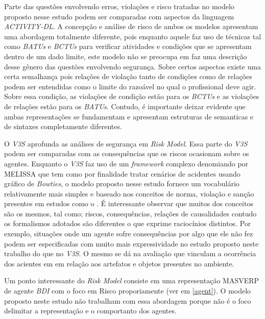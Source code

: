 Parte das questões envolvendo erros, violações e risco tratadas no modelo proposto nesse estudo podem ser comparadas com aspectos da linguagem \textit{ACTIVITY-DL}. A concepção e análise de risco de ambos os modelos apresentam uma abordagem totalmente diferente, pois enquanto aquele faz uso de técnicas tal como \textit{BATUs} e \textit{BCTUs} para verificar atividades e condições que se apresentam dentro de um dado limite, este modelo não se preocupa em faz uma descrição desse gênero das questões envolvendo segurança. Sobre certos aspectos existe uma certa semalhança pois relações de violação tanto de condições como de relações podem ser entendidas como o limite do razoável no qual o profissional deve agir. Sobre essa condição, as violações de condição estão para os \textit{BCTUs} e as violações de relações estão para os \textit{BATUs}. Contudo, é importante deixar evidente que ambas representações se fundamentam e apresentam estruturas de semanticas e de sintaxes completamente diferentes. 

O \textit{V3S} aprofunda as análises de segurança em \textit{Risk Model}. Essa parte do \textit{V3S} podem ser comparadas com as consequências que os riscos ocasionam sobre os agentes. Enquanto 
o \textit{V3S} faz uso de um \textit{framework} complexo denomiando por MELISSA que tem como por finalidade tratar cenários de acidentes usando gráfico de \textit{Bowties}, o modelo proposto nesse estudo fornece um vocabulário relativamente mais simples e baseado nos conceitos de norma, violação e sanção presentes em estudos como o \cite{dastaniframework}. É interessante observar 
que muitos dos conceitos são os mesmos, tal como; riscos, consequências, relações de causalidades contudo os formalismos adotados são diferentes o que exprime raciocínios distintos. Por exemplo, 
situações onde um agente sofre consequências por algo que ele não fez podem ser especificadas com muito mais expressividade no estudo proposto neste trabalho do que no \textit{V3S}. O mesmo se 
dá na avaliação que vinculam a ocorrência dos acientes em em relação aos artefatos e objetos presentes no ambiente. 

Um ponto interessante do \textit{Risk Model} consiste em uma representação MASVERP  de agente \textit{BDI} com o foco em Risco proporiamente (ver em \ref{agent}). O modelo proposto neste estudo não trabalham com essa abordagem porque não é o foco delimitar a representação e o comportanto dos agentes.


